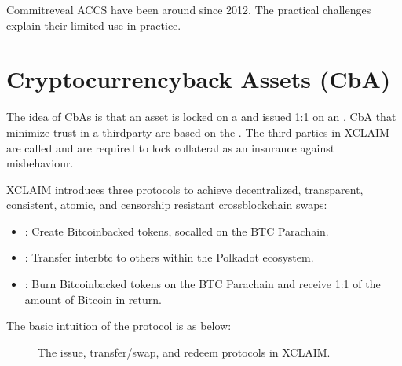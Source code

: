 \documentclass[a4paper,10pt,english]{sphinxmanual}
\begin{document}
Commit\sphinxhyphen{}reveal ACCS have been around since 2012. The practical challenges explain their limited use in practice.


\section{Cryptocurrency\sphinxhyphen{}back Assets (CbA)}
\label{\detokenize{intro/CbA:cryptocurrency-back-assets-cba}}
The idea of CbAs is that an asset is locked on a  and issued 1:1 on an . CbA that minimize trust in a third\sphinxhyphen{}party are based on the . The third parties in XCLAIM are called  and are required to lock collateral as an insurance against misbehaviour.

XCLAIM introduces three protocols to achieve decentralized, transparent, consistent, atomic, and censorship resistant cross\sphinxhyphen{}blockchain swaps:
\begin{itemize}
\item {} 
: Create Bitcoin\sphinxhyphen{}backed tokens, so\sphinxhyphen{}called  on the BTC Parachain.

\item {} 
: Transfer interbtc to others within the Polkadot ecosystem.

\item {} 
: Burn Bitcoin\sphinxhyphen{}backed tokens on the BTC Parachain and receive 1:1 of the amount of Bitcoin in return.

\end{itemize}

The basic intuition of the protocol is as below:

\begin{figure}[htbp]
\centering
\capstart

\noindent{}
\caption{The issue, transfer/swap, and redeem protocols in XCLAIM.}\label{\detokenize{intro/CbA:id1}}\end{figure}
\end{document}

